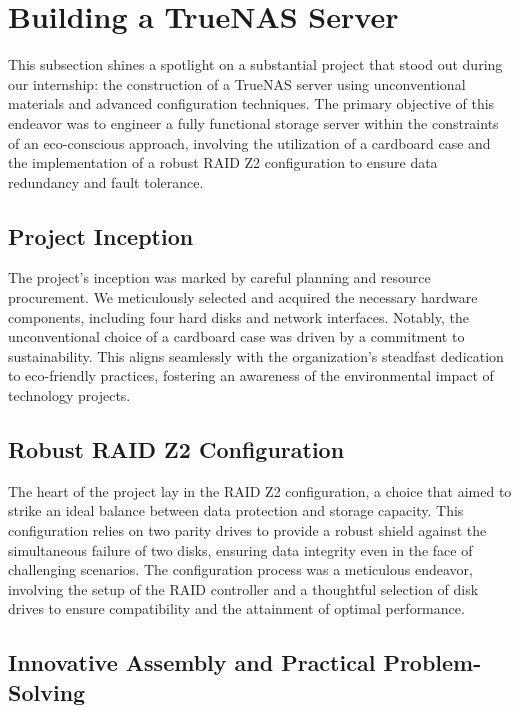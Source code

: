 \section{Building a TrueNAS Server}

This subsection shines a spotlight on a substantial project that stood out during our internship: the construction of a TrueNAS server using unconventional materials and advanced configuration techniques. The primary objective of this endeavor was to engineer a fully functional storage server within the constraints of an eco-conscious approach, involving the utilization of a cardboard case and the implementation of a robust RAID Z2 configuration to ensure data redundancy and fault tolerance.

\subsection{Project Inception}

The project's inception was marked by careful planning and resource procurement. We meticulously selected and acquired the necessary hardware components, including four hard disks and network interfaces. Notably, the unconventional choice of a cardboard case was driven by a commitment to sustainability. This aligns seamlessly with the organization's steadfast dedication to eco-friendly practices, fostering an awareness of the environmental impact of technology projects.

\subsection{Robust RAID Z2 Configuration}

The heart of the project lay in the RAID Z2 configuration, a choice that aimed to strike an ideal balance between data protection and storage capacity\cite{yi2023optimizations }. This configuration relies on two parity drives to provide a robust shield against the simultaneous failure of two disks, ensuring data integrity even in the face of challenging scenarios. The configuration process was a meticulous endeavor, involving the setup of the RAID controller and a thoughtful selection of disk drives to ensure compatibility and the attainment of optimal performance.

\subsection{Innovative Assembly and Practical Problem-Solving}

